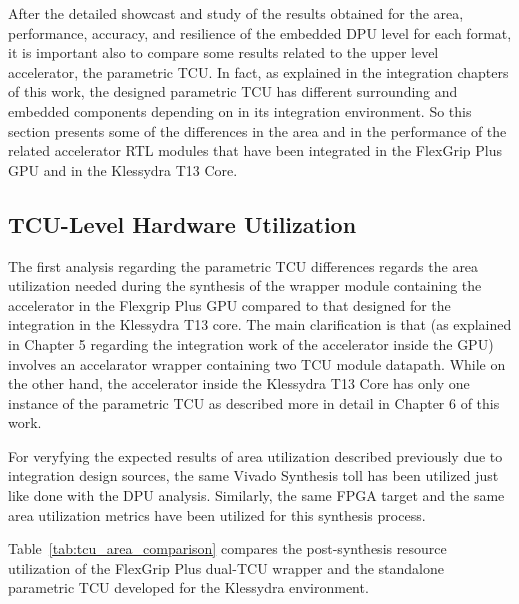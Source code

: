 After the detailed showcast and study of the results obtained for the area, performance, accuracy, and resilience of the embedded DPU level for each format, it is important also to compare some results related to the upper level accelerator, the parametric TCU. In fact, as explained in the integration chapters of this work, the designed parametric TCU has different surrounding and embedded components depending on in its integration environment. So this section presents some of the differences in the area and in the performance of the related accelerator RTL modules that have been integrated in the FlexGrip Plus GPU and in the Klessydra T13 Core.

\newpage
\subsection{TCU-Level Hardware Utilization}

The first analysis regarding the parametric TCU differences regards the area utilization needed during the synthesis of the wrapper module containing the accelerator in the Flexgrip Plus GPU compared to that designed for the integration in the Klessydra T13 core. The main clarification is that (as explained in Chapter 5 regarding the integration work of the accelerator inside the GPU) involves an accelarator wrapper containing two TCU module datapath. While on the other hand, the accelerator inside the Klessydra T13 Core has only one instance of the parametric TCU as described more in detail in Chapter 6 of this work.

For veryfying the expected results of area utilization described previously due to integration design sources, the same Vivado Synthesis toll has been utilized just like done with the DPU analysis. Similarly, the same FPGA target and the same area utilization metrics have been utilized for this synthesis process.

Table~\ref{tab:tcu_area_comparison} compares the post-synthesis
resource utilization of the FlexGrip Plus dual-TCU wrapper and the
standalone parametric TCU developed for the Klessydra environment.

